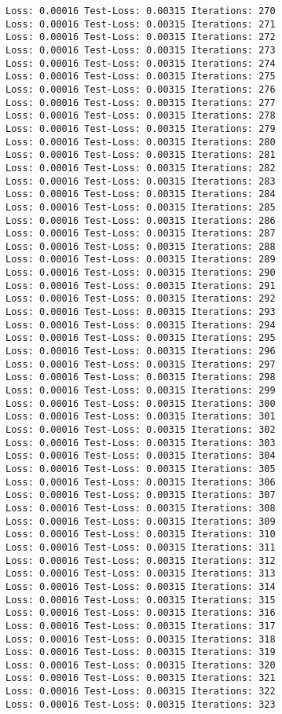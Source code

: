 \documentclass[11pt]{article}
\begin{document}
\begin{Verbatim}[commandchars=\\\{\}]
Loss: 0.00016 Test-Loss: 0.00315 Iterations: 270
Loss: 0.00016 Test-Loss: 0.00315 Iterations: 271
Loss: 0.00016 Test-Loss: 0.00315 Iterations: 272
Loss: 0.00016 Test-Loss: 0.00315 Iterations: 273
Loss: 0.00016 Test-Loss: 0.00315 Iterations: 274
Loss: 0.00016 Test-Loss: 0.00315 Iterations: 275
Loss: 0.00016 Test-Loss: 0.00315 Iterations: 276
Loss: 0.00016 Test-Loss: 0.00315 Iterations: 277
Loss: 0.00016 Test-Loss: 0.00315 Iterations: 278
Loss: 0.00016 Test-Loss: 0.00315 Iterations: 279
Loss: 0.00016 Test-Loss: 0.00315 Iterations: 280
Loss: 0.00016 Test-Loss: 0.00315 Iterations: 281
Loss: 0.00016 Test-Loss: 0.00315 Iterations: 282
Loss: 0.00016 Test-Loss: 0.00315 Iterations: 283
Loss: 0.00016 Test-Loss: 0.00315 Iterations: 284
Loss: 0.00016 Test-Loss: 0.00315 Iterations: 285
Loss: 0.00016 Test-Loss: 0.00315 Iterations: 286
Loss: 0.00016 Test-Loss: 0.00315 Iterations: 287
Loss: 0.00016 Test-Loss: 0.00315 Iterations: 288
Loss: 0.00016 Test-Loss: 0.00315 Iterations: 289
Loss: 0.00016 Test-Loss: 0.00315 Iterations: 290
Loss: 0.00016 Test-Loss: 0.00315 Iterations: 291
Loss: 0.00016 Test-Loss: 0.00315 Iterations: 292
Loss: 0.00016 Test-Loss: 0.00315 Iterations: 293
Loss: 0.00016 Test-Loss: 0.00315 Iterations: 294
Loss: 0.00016 Test-Loss: 0.00315 Iterations: 295
Loss: 0.00016 Test-Loss: 0.00315 Iterations: 296
Loss: 0.00016 Test-Loss: 0.00315 Iterations: 297
Loss: 0.00016 Test-Loss: 0.00315 Iterations: 298
Loss: 0.00016 Test-Loss: 0.00315 Iterations: 299
Loss: 0.00016 Test-Loss: 0.00315 Iterations: 300
Loss: 0.00016 Test-Loss: 0.00315 Iterations: 301
Loss: 0.00016 Test-Loss: 0.00315 Iterations: 302
Loss: 0.00016 Test-Loss: 0.00315 Iterations: 303
Loss: 0.00016 Test-Loss: 0.00315 Iterations: 304
Loss: 0.00016 Test-Loss: 0.00315 Iterations: 305
Loss: 0.00016 Test-Loss: 0.00315 Iterations: 306
Loss: 0.00016 Test-Loss: 0.00315 Iterations: 307
Loss: 0.00016 Test-Loss: 0.00315 Iterations: 308
Loss: 0.00016 Test-Loss: 0.00315 Iterations: 309
Loss: 0.00016 Test-Loss: 0.00315 Iterations: 310
Loss: 0.00016 Test-Loss: 0.00315 Iterations: 311
Loss: 0.00016 Test-Loss: 0.00315 Iterations: 312
Loss: 0.00016 Test-Loss: 0.00315 Iterations: 313
Loss: 0.00016 Test-Loss: 0.00315 Iterations: 314
Loss: 0.00016 Test-Loss: 0.00315 Iterations: 315
Loss: 0.00016 Test-Loss: 0.00315 Iterations: 316
Loss: 0.00016 Test-Loss: 0.00315 Iterations: 317
Loss: 0.00016 Test-Loss: 0.00315 Iterations: 318
Loss: 0.00016 Test-Loss: 0.00315 Iterations: 319
Loss: 0.00016 Test-Loss: 0.00315 Iterations: 320
Loss: 0.00016 Test-Loss: 0.00315 Iterations: 321
Loss: 0.00016 Test-Loss: 0.00315 Iterations: 322
Loss: 0.00016 Test-Loss: 0.00315 Iterations: 323

\end{Verbatim}
\end{document}
